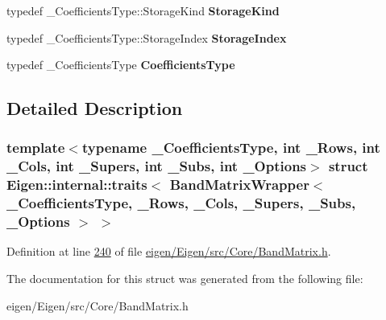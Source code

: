 \begin{DoxyCompactItemize}
typedef \+\_\+\+Coefficients\+Type\+::\+Storage\+Kind {\bfseries Storage\+Kind}
\item 
\mbox{\label{struct_eigen_1_1internal_1_1traits_3_01_band_matrix_wrapper_3_01___coefficients_type_00_01___row768e2717402a9eceb38d536f65ceb4f1_ae98a369b86b0474b2442cf1e5b3b813a}} 
typedef \+\_\+\+Coefficients\+Type\+::\+Storage\+Index {\bfseries Storage\+Index}
\item 
\mbox{\label{struct_eigen_1_1internal_1_1traits_3_01_band_matrix_wrapper_3_01___coefficients_type_00_01___row768e2717402a9eceb38d536f65ceb4f1_abffdc4d87f27cd7fa68c213d26b801f5}} 
typedef \+\_\+\+Coefficients\+Type {\bfseries Coefficients\+Type}
\end{DoxyCompactItemize}


\subsection{Detailed Description}
\subsubsection*{template$<$typename \+\_\+\+Coefficients\+Type, int \+\_\+\+Rows, int \+\_\+\+Cols, int \+\_\+\+Supers, int \+\_\+\+Subs, int \+\_\+\+Options$>$\newline
struct Eigen\+::internal\+::traits$<$ Band\+Matrix\+Wrapper$<$ \+\_\+\+Coefficients\+Type, \+\_\+\+Rows, \+\_\+\+Cols, \+\_\+\+Supers, \+\_\+\+Subs, \+\_\+\+Options $>$ $>$}



Definition at line \hyperlink{eigen_2_eigen_2src_2_core_2_band_matrix_8h_source_l00240}{240} of file \hyperlink{eigen_2_eigen_2src_2_core_2_band_matrix_8h_source}{eigen/\+Eigen/src/\+Core/\+Band\+Matrix.\+h}.



The documentation for this struct was generated from the following file\+:\begin{DoxyCompactItemize}
\item 
eigen/\+Eigen/src/\+Core/\+Band\+Matrix.\+h\end{DoxyCompactItemize}
